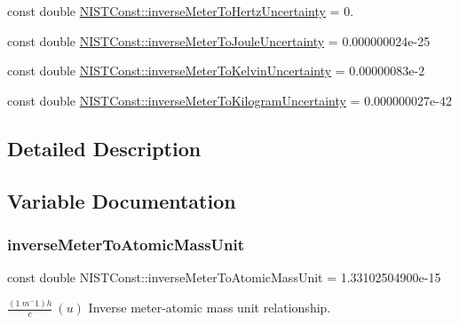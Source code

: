 \begin{DoxyCompactItemize}
\item 
const double \hyperlink{group___inverse_meter_ga96ba9736f99affda3bf53cb99bda10b0}{N\+I\+S\+T\+Const\+::inverse\+Meter\+To\+Hertz\+Uncertainty} = 0.
\item 
const double \hyperlink{group___inverse_meter_gae5a72bfc7da337d98e1df913d379cf66}{N\+I\+S\+T\+Const\+::inverse\+Meter\+To\+Joule\+Uncertainty} = 0.\+000000024e-\/25
\item 
const double \hyperlink{group___inverse_meter_gad0b83065f808c922edc87282db57f184}{N\+I\+S\+T\+Const\+::inverse\+Meter\+To\+Kelvin\+Uncertainty} = 0.\+00000083e-\/2
\item 
const double \hyperlink{group___inverse_meter_gaedbe76575234cd5252d6a4b2ef8db104}{N\+I\+S\+T\+Const\+::inverse\+Meter\+To\+Kilogram\+Uncertainty} = 0.\+000000027e-\/42
\end{DoxyCompactItemize}


\subsection{Detailed Description}


\subsection{Variable Documentation}
\mbox{\label{group___inverse_meter_ga7d76b1c26bd9b6226d0bdbcbfe44c3a0}} 
\subsubsection{\texorpdfstring{inverse\+Meter\+To\+Atomic\+Mass\+Unit}{inverseMeterToAtomicMassUnit}}
{\footnotesize\ttfamily const double N\+I\+S\+T\+Const\+::inverse\+Meter\+To\+Atomic\+Mass\+Unit = 1.\+33102504900e-\/15}

$\frac{(1\ m^-1)h}{c} \ (u)$ Inverse meter-\/atomic mass unit relationship. \mbox{\label{group___inverse_meter_ga19f65e8c675ab4bbf77f2d7fcc27dec8}} 
